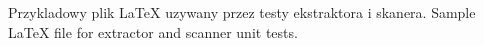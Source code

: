\documentclass{article}
\begin{document}
Przykladowy plik LaTeX uzywany przez testy ekstraktora i skanera.
Sample LaTeX file for extractor and scanner unit tests.
\end{document}
